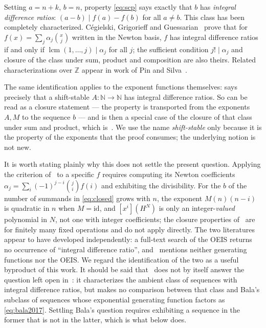 \documentclass[11pt,a4paper]{article}
\theoremstyle{plain}
\theoremstyle{definition}
\DeclareMathOperator{\lcm}{lcm}
\newcommand{\N}{\mathbb{N}}
\newcommand{\Z}{\mathbb{Z}}
\newcommand{\coeff}[1]{[x^{#1}]}
\begin{document}
Setting $a=n+k$, $b=n$, property \eqref{eq:scp} says exactly that $b$ has
\emph{integral difference ratios}: $(a-b)\mid f(a)-f(b)$ for all $a\ne b$. This class has
been completely characterized. Cégielski, Grigorieff and
Guessarian~\cite{cgg2015} prove that for $f(x)=\sum_{j}\alpha_j\binom{x}{j}$ written in
the Newton basis, $f$ has integral difference ratios if and only if
$\lcm(1,\dots,j)\mid\alpha_j$ for all $j$; the sufficient condition $j!\mid\alpha_j$ and
closure of the class under sum, product and composition are also theirs. Related
characterizations over $\Z$ appear in work of Pin and Silva~\cite{pinsilva2011}.

The same identification applies to the exponent functions themselves:  says
precisely that a shift-stable $A\colon\N\to\N$ has integral difference ratios. So
 can be read as a closure statement --- the property is transported from
the exponents $A,M$ to the sequence $b$ --- and  is then a special case
of the closure of that class under sum and product, which is~\cite{cgg2015}. We use the
name \emph{shift-stable} only because it is the property of the exponents that the proof
consumes; the underlying notion is not new.

It is worth stating plainly why this does not settle the present question. Applying the
criterion of~\cite{cgg2015} to a specific $f$ requires computing its Newton coefficients
$\alpha_j=\sum_{i}(-1)^{j-i}\binom{j}{i}f(i)$ and exhibiting the divisibility. For the
$b$ of  the number of summands in \eqref{eq:closed} grows with $n$, the
exponent $M(n)(n-i)$ is quadratic in $n$ when $M=\mathrm{id}$, and
$\coeff{i}(H^{N})$ is only an integer-\emph{valued} polynomial in $N$, not one with
integer coefficients; the closure properties of~\cite{cgg2015} are for finitely many
fixed operations and do not apply directly. The two literatures appear to have developed
independently: a full-text search of the OEIS returns no occurrence of ``integral
difference ratio'', and~\cite{cgg2015} mentions neither generating functions nor the OEIS.
We regard the identification of the two as a useful byproduct of this work. It should be
said that~\cite{cgg2015} does not by itself answer the question left open
in~\cite{bala2017}: it characterizes the ambient class of sequences with integral
difference ratios, but makes no comparison between that class and Bala's subclass of
sequences whose exponential generating function factors as \eqref{eq:bala2017}. Settling
Bala's question requires exhibiting a sequence in the former that is not in the latter,
which is what  below does.
\end{document}

